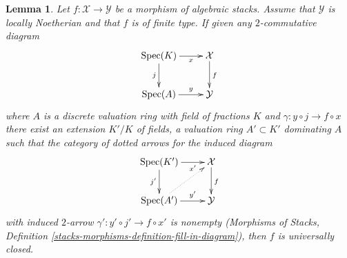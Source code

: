 \documentclass{stacks-project}
\theoremstyle{plain}
\newtheorem{lemma}[subsection]{Lemma}
\theoremstyle{definition}
\theoremstyle{remark}
\numberwithin{equation}{subsection}
\def\Spec{\mathop{\mathrm{Spec}}}
\begin{document}
\begin{lemma}
\label{lemma-valuative-criterion-universally-closed}
Let $f : \mathcal{X} \to \mathcal{Y}$ be a morphism of algebraic stacks.
Assume that $\mathcal{Y}$ is locally Noetherian and that $f$ is of finite type.
If given any $2$-commutative diagram
$$
\xymatrix{
\Spec(K) \ar[r]_-x \ar[d]_j & \mathcal{X} \ar[d]^f \\
\Spec(A) \ar[r]^-y & \mathcal{Y}
}
$$
where $A$ is a discrete valuation ring with field of fractions $K$
and $\gamma : y \circ j \to f \circ x$ there exist an extension $K'/K$
of fields, a valuation ring $A' \subset K'$ dominating $A$ such that
the category of dotted arrows for the induced diagram
$$
\xymatrix{
\Spec(K') \ar[r]_-{x'} \ar[d]_{j'} & \mathcal{X} \ar[d]^f \\
\Spec(A') \ar[r]^-{y'} \ar@{..>}[ru] & \mathcal{Y}
}
$$
with induced $2$-arrow $\gamma' : y' \circ j' \to f \circ x'$
is nonempty (Morphisms of Stacks, Definition
\ref{stacks-morphisms-definition-fill-in-diagram}), then $f$ is
universally closed.
\end{lemma}
\end{document}
